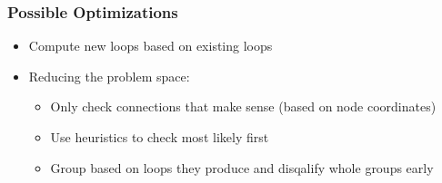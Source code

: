 \documentclass{beamer}
\begin{document}
\begin{frame}
\frametitle{Possible Optimizations}
  \begin{itemize}
    \item Compute new loops based on existing loops
    \item Reducing the problem space:
    \begin{itemize}
      \item Only check connections that make sense (based on node coordinates)
      \item Use heuristics to check most likely first
      \item Group based on loops they produce and disqalify whole groups early
    \end{itemize}
  \end{itemize}
\end{frame}
\end{document}
